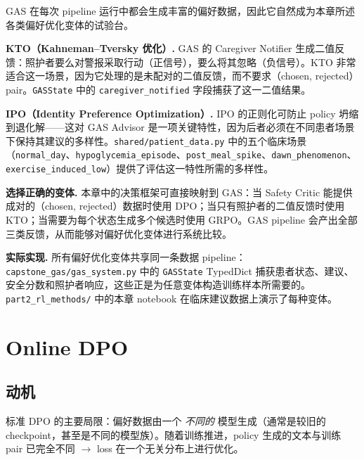 \begin{keybox}
GAS 在每次 pipeline 运行中都会生成丰富的偏好数据，因此它自然成为本章所述各类偏好优化变体的试验台。

\textbf{KTO（Kahneman--Tversky 优化）.}
GAS 的 Caregiver Notifier 生成二值反馈：照护者要么对警报采取行动（正信号），要么将其忽略（负信号）。KTO 非常适合这一场景，因为它处理的是未配对的二值反馈，而不要求（chosen, rejected）pair。\texttt{GASState} 中的 \texttt{caregiver\_notified} 字段捕获了这一二值结果。

\textbf{IPO（Identity Preference Optimization）.}
IPO 的正则化可防止 policy 坍缩到退化解——这对 GAS Advisor 是一项关键特性，因为后者必须在不同患者场景下保持其建议的多样性。\texttt{shared/patient\_data.py} 中的五个临床场景（\texttt{normal\_day}、\texttt{hypoglycemia\_episode}、\texttt{post\_meal\_spike}、\texttt{dawn\_phenomenon}、\texttt{exercise\_induced\_low}）提供了评估这一特性所需的多样性。

\textbf{选择正确的变体.}
本章中的决策框架可直接映射到 GAS：当 Safety Critic 能提供成对的（chosen, rejected）数据时使用 DPO；当只有照护者的二值反馈时使用 KTO；当需要为每个状态生成多个候选时使用 GRPO。GAS pipeline 会产出全部三类反馈，从而能够对偏好优化变体进行系统比较。

\textbf{实际实现.}
所有偏好优化变体共享同一条数据 pipeline：\texttt{capstone\_gas/gas\_system.py} 中的 \texttt{GASState} TypedDict 捕获患者状态、建议、安全分数和照护者响应，这些正是为任意变体构造训练样本所需要的。\texttt{part2\_rl\_methods/} 中的本章 notebook 在临床建议数据上演示了每种变体。
\end{keybox}

\section{Online DPO}
\label{sec:online-dpo}

\subsection{动机}
\label{motivation-dup3}

标准 DPO 的主要局限：偏好数据由一个 \emph{不同的} 模型生成（通常是较旧的 checkpoint，甚至是不同的模型族）。随着训练推进，policy 生成的文本与训练 pair 已完全不同 $\rightarrow$ loss 在一个无关分布上进行优化。

